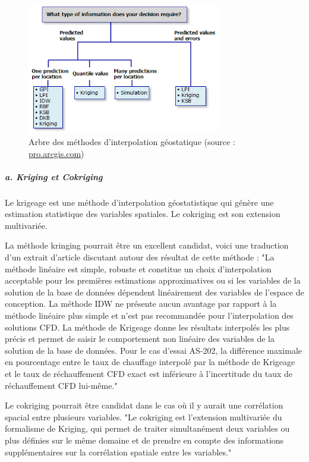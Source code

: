 \begin{figure}[H]
    \centering
    \includegraphics[width=0.75\textwidth]{images/arcgis.png}
    \caption{Arbre des méthodes d'interpolation géostatique (source : \href{https://pro.arcgis.com/fr/pro-app/latest/help/analysis/geostatistical-analyst/classification-trees-of-the-interpolation-methods-offered-in-geostatistical-analyst.htm}{pro.arcgis.com})}
    \label{fig:arcgis}
\end{figure}


\subparagraph{a. Kriging et Cokriging} %
Le krigeage est une méthode d'interpolation géostatistique qui génère une estimation statistique des variables spatiales. Le cokriging est son extension multivariée. 

La méthode kringing pourrait être un excellent candidat, voici une traduction d'un extrait d'article discutant autour des résultat de cette méthode :
"La méthode linéaire est simple, robuste et constitue un choix d'interpolation acceptable pour les premières estimations approximatives ou si les variables de la solution de la base de données dépendent linéairement des variables de l'espace de conception. La méthode IDW ne présente aucun avantage par rapport à la méthode linéaire plus simple et n'est pas recommandée pour l'interpolation des solutions CFD. La méthode de Krigeage donne les résultats interpolés les plus précis et permet de saisir le comportement non linéaire des variables de la solution de la base de données. Pour le cas d'essai AS-202, la différence maximale en pourcentage entre le taux de chauffage interpolé par la méthode de Krigeage et le taux de réchauffement CFD exact est inférieure à l'incertitude du taux de réchauffement CFD lui-même."\cite{palmer2009}


Le cokriging pourrait être candidat dans le cas où il y aurait une corrélation spacial entre plusieurs variables.
"Le cokriging est l'extension multivariée du formalisme de Kriging, qui permet de traiter simultanément deux variables ou plus définies sur le même domaine et de prendre en compte des informations supplémentaires sur la corrélation spatiale entre les variables."\cite{kringing}

